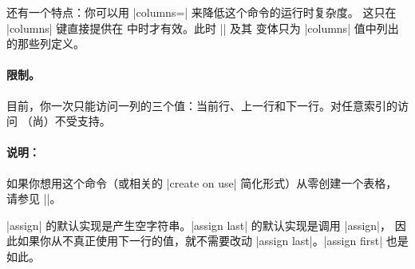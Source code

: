 \documentclass[a4paper,doc2]{ltxdoc}
\begin{document}
\begin{command}{\pgfplotstablecreatecol{}}
    还有一个特点：你可以用 |columns=| 来降低这个命令的运行时复杂度。
    这只在 |columns| 键直接提供在  中时才有效。此时 |\thisrow| 及其
    变体只为 |columns| 值中列出的那些列定义。


    \paragraph{限制。}

    目前，你一次只能访问一列的三个值：当前行、上一行和下一行。对任意索引的访问
    （尚）不受支持。


    \paragraph{说明：}

    如果你想用这个命令（或相关的 |create on use| 简化形式）从零创建一个表格，
    请参见 |\pgfplotstablenew|。

    |assign| 的默认实现是产生空字符串。|assign last| 的默认实现是调用 |assign|，
    因此如果你从不真正使用下一行的值，就不需要改动 |assign last|。|assign first|
    也是如此。
\end{command}
\end{document}
